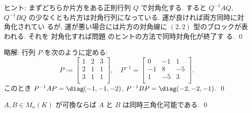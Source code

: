 \documentclass[12pt,twoside]{jarticle}
\newcommand\commentout[1]{#1}
\newcommand\commentout[1]{}
\begin{document}
\noindent
ヒント: まずどちらか片方をある正則行列 $Q$ で対角化する. 
すると $Q^{-1}AQ$, $Q^{-1}BQ$ の少なくとも片方は対角行列になっている.  
運が良ければ両方同時に対角化されてい
るが, 運が悪い場合には片方の対角線に $(2,2)$ 型のブロックが表われる.  それを
対角化すれば問題  のヒントの方法で同時対角化が終了す
る.
\qed

\commentout{
\medskip
\noindent
略解: 行列 $P$ を次のように定める:
\begin{equation*}
  P :=
  \begin{bmatrix}
    1 & 2 & 3 \\
    2 & 1 & 1 \\
    3 & 1 & 1 \\
  \end{bmatrix},
  \quad
  P^{-1} = 
  \begin{bmatrix}
     0 & -1 &  1 \\
    -1 &  8 & -5 \\
     1 & -5 &  3 \\
  \end{bmatrix}.
\end{equation*}
このとき $P^{-1}AP=\diag(-1,-1,-2)$, $P^{-1}BP=\diag(-2,-2,-1)$.
\qed
}

% 
% 
% 
% 
% 
% 
% 
% 
% 
% 
% 


\begin{question}[同時三角化]
\label{q:triangulizable:A,B}
  $A,B\in M_n(K)$ が可換ならば $A$ と $B$ は同時三角化可能である.
  \qed
\end{question}
\end{document}
